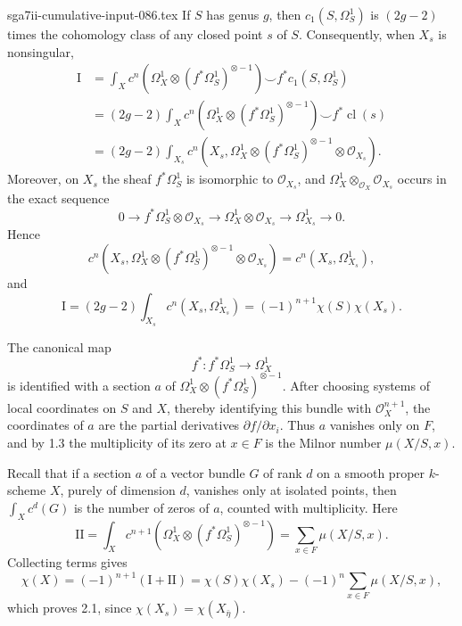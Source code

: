 \begin{filecontents*}{sga7ii-cumulative-input-086.tex}
If $S$ has genus $g$, then $c_1(S,\Omega_S^1)$ is $(2g-2)$
times the cohomology class of any closed point $s$ of $S$.
Consequently, when $X_s$ is nonsingular,
\begin{align*}
\mathrm I
&=\int_Xc^n\!\left(\Omega_X^1\otimes
(f^*\Omega_S^1)^{\otimes-1}\right)
\smile f^*c_1(S,\Omega_S^1)\\
&=(2g-2)\int_Xc^n\!\left(\Omega_X^1\otimes
(f^*\Omega_S^1)^{\otimes-1}\right)
\smile f^*\operatorname{cl}(s)\\
&=(2g-2)\int_{X_s}c^n\!\left(
X_s,\Omega_X^1\otimes(f^*\Omega_S^1)^{\otimes-1}
\otimes\mathcal O_{X_s}\right).
\end{align*}
Moreover, on $X_s$ the sheaf $f^*\Omega_S^1$ is isomorphic to
$\mathcal O_{X_s}$, and
$\Omega_X^1\otimes_{\mathcal O_X}\mathcal O_{X_s}$ occurs in the
exact sequence
\[
0\longrightarrow f^*\Omega_S^1\otimes\mathcal O_{X_s}
\longrightarrow\Omega_X^1\otimes\mathcal O_{X_s}
\longrightarrow\Omega_{X_s}^1\longrightarrow0.
\]
Hence
\[
c^n\!\left(X_s,\Omega_X^1\otimes
(f^*\Omega_S^1)^{\otimes-1}\otimes\mathcal O_{X_s}\right)
=c^n(X_s,\Omega_{X_s}^1),
\]
and
\[
\mathrm I=(2g-2)\int_{X_s}c^n(X_s,\Omega_{X_s}^1)
=(-1)^{n+1}\chi(S)\chi(X_s).
\]

The canonical map
\[
f^*:f^*\Omega_S^1\longrightarrow\Omega_X^1
\]
is identified with a section $a$ of
$\Omega_X^1\otimes(f^*\Omega_S^1)^{\otimes-1}$.  After choosing
systems of local coordinates on $S$ and $X$, thereby identifying
this bundle with $\mathcal O_X^{n+1}$, the coordinates of $a$ are
the partial derivatives $\partial f/\partial x_i$.  Thus $a$
vanishes only on $F$, and by 1.3 the multiplicity of its zero at
$x\in F$ is the Milnor number $\mu(X/S,x)$.

Recall that if a section $a$ of a vector bundle $G$ of rank $d$ on
a smooth proper $k$-scheme $X$, purely of dimension $d$, vanishes
only at isolated points, then $\int_Xc^d(G)$ is the number of zeros
of $a$, counted with multiplicity.  Here
\[
\mathrm{II}=\int_Xc^{n+1}\!\left(
\Omega_X^1\otimes(f^*\Omega_S^1)^{\otimes-1}\right)
=\sum_{x\in F}\mu(X/S,x).
\]
Collecting terms gives
\[
\chi(X)=(-1)^{n+1}(\mathrm I+\mathrm{II})
=\chi(S)\chi(X_s)-(-1)^n\sum_{x\in F}\mu(X/S,x),
\]
which proves 2.1, since
$\chi(X_s)=\chi(X_{\bar\eta})$.
\end{filecontents*}
